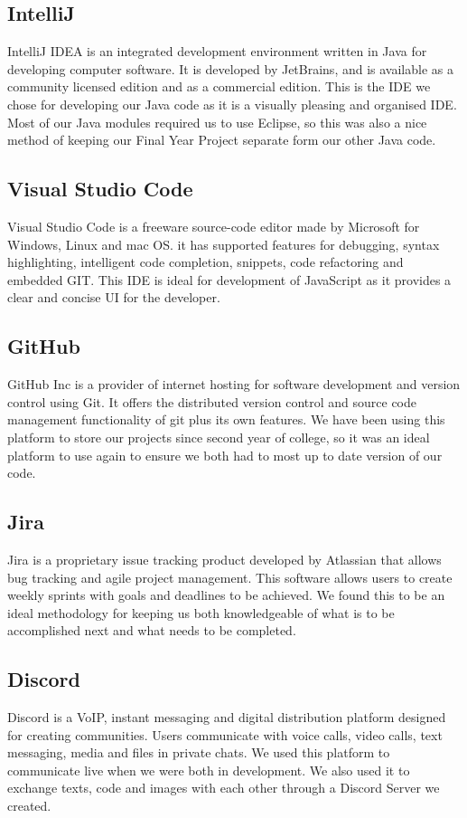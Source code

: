 \subsection{IntelliJ}
IntelliJ IDEA is an integrated development environment written in Java for developing computer software. It is developed by JetBrains, and is available as a community licensed edition and as a commercial edition. This is the IDE we chose for developing our Java code as it is a visually pleasing and organised IDE. Most of our Java modules required us to use Eclipse, so this was also a nice method of keeping our Final Year Project separate form our other Java code.

\subsection{Visual Studio Code}
Visual Studio Code is a freeware source-code editor made by Microsoft for Windows, Linux and mac OS. it has supported features for debugging, syntax highlighting, intelligent code completion, snippets, code refactoring and embedded GIT. This IDE is ideal for development of JavaScript as it provides a clear and concise UI for the developer.

\subsection{GitHub}
GitHub Inc is a provider of internet hosting for software development and version control using Git. It offers the distributed version control and source code management functionality of git plus its own features. We have been using this platform to store our projects since second year of college, so it was an ideal platform to use again to ensure we both had to most up to date version of our code.

\subsection{Jira}
Jira is a proprietary issue tracking product developed by Atlassian that allows bug tracking and agile project management. This software allows users to create weekly sprints with goals and deadlines to be achieved. We found this to be an ideal methodology for keeping us both knowledgeable of what is to be accomplished next and what needs to be completed.

\subsection{Discord}
Discord is a VoIP, instant messaging and digital distribution platform designed for creating communities. Users communicate with voice calls, video calls, text messaging, media and files in private chats. We used this platform to communicate live when we were both in development. We also used it to exchange texts, code and images with each other through a Discord Server we created.

